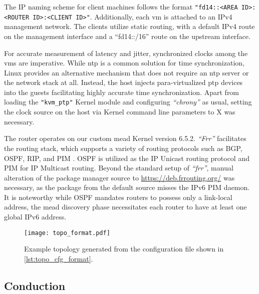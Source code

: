 The IP naming scheme for client machines follows the format
    \texttt{"fd14::<AREA ID>:<ROUTER ID>:<CLIENT ID>"}.
Additionally, each \gls{vm} is attached to an IPv4 management network.
The clients utilize static routing, with a default IPv4 route on the management
    interface and a ``fd14::/16'' route on the upstream interface.

For accurate measurement of latency and jitter, synchronized clocks among the
    \glspl{vm} are imperative.
While \gls{ntp} is a common solution for time synchronization, Linux provides
    an alternative mechanism that does not require an \gls{ntp} server or the 
    network stack at all.
Instead, the host injects para-virtualized \gls{ptp} devices into the guests
    facilitating highly accurate time synchronization.
Apart from loading the \texttt{"kvm\_ptp"} Kernel module and configuring
    \textit{``chrony''} as usual, setting the clock source on the host via
    Kernel command line parameters to X was necessary.

The router operates on our custom \gls{mead} Kernel version 6.5.2.
\textit{``Frr''} facilitates the routing stack, which supports a variety of
    routing protocols such as BGP, OSPF, RIP, and PIM \cite{frr_doc}.
OSPF is utilized as the IP Unicast routing protocol and PIM for IP Multicast
    routing.
Beyond the standard setup of \textit{``frr''}, manual alteration of the package
    manager source to \url{https://deb.frrouting.org/} was necessary, as the
    package from the default source misses the IPv6 PIM daemon.
It is noteworthy while OSPF mandates routers to possess only a link-local
    address, the \gls{mead} discovery phase necessitates each router to have at
    least one global IPv6 address.

\begin{figure}
    \begin{center}
        \texttt{[image: topo\_format.pdf]}
    \end{center}
    \caption[Example topology]{
        Example topology generated from the configuration file shown in
        \autoref{lst:topo_cfg_format}.
    }
    \label{fig:ex_topo}
\end{figure}


\subsection{Conduction} %
\label{sub:Conduction}

